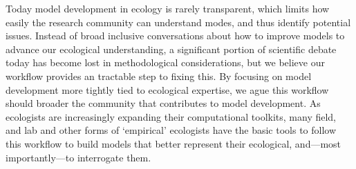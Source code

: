 \documentclass[11pt]{article}
\begin{document}
Today model development in ecology is rarely transparent, which limits how easily the research community can understand modes, and thus identify potential issues. Instead of broad inclusive conversations about how to improve models to advance our ecological understanding, a significant portion of scientific debate today has become lost in methodological considerations, but we believe our workflow provides an tractable step to fixing this. By focusing on model development more tightly tied to ecological expertise, we ague this workflow should broader the community that contributes to model development. As ecologists are increasingly expanding their computational toolkits, many field, and lab and other forms of `empirical' ecologists have the basic tools to follow this workflow to build models that better represent their ecological, and---most importantly---to interrogate them.

\clearpage

\end{document}
